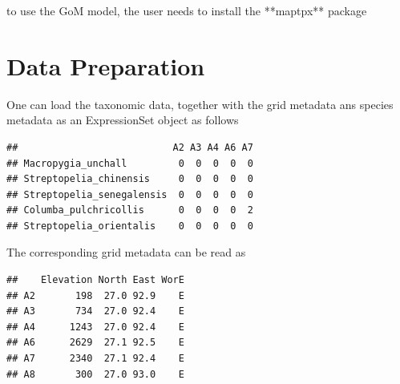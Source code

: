 \documentclass[12pt]{article}
\begin{document}
to use the GoM model, the user needs to install the **maptpx** package

\begin{knitrout}
\color{fgcolor}\begin{kframe}
\begin{alltt}
\hlstd{(}\hlstd{)}
\end{alltt}
\end{kframe}
\end{knitrout}


\section{Data Preparation}

One can load the taxonomic data, together with the grid metadata ans species metadata as an ExpressionSet object as follows

\begin{knitrout}
\color{fgcolor}\begin{kframe}
\begin{alltt}
 \hlkwb{<-} \hlstd{(}\hlstd{(}\hlstd{(}\hlstd{,} \hlstd{,}
                              \hlstd{=} \hlstd{)))}
 \hlkwb{<-} 
\hlstd{taxonomic_counts[}\hlopt{:}\hlstd{,}\hlopt{:}\hlstd{]}
\end{alltt}
\begin{verbatim}
##                           A2 A3 A4 A6 A7
## Macropygia_unchall         0  0  0  0  0
## Streptopelia_chinensis     0  0  0  0  0
## Streptopelia_senegalensis  0  0  0  0  0
## Columba_pulchricollis      0  0  0  0  2
## Streptopelia_orientalis    0  0  0  0  0
\end{verbatim}
\end{kframe}
\end{knitrout}


The corresponding grid metadata can be read as

\begin{knitrout}
\color{fgcolor}\begin{kframe}
\begin{alltt}
 \hlkwb{<-} \hlstd{(}
\end{alltt}
\begin{verbatim}
##    Elevation North East WorE
## A2       198  27.0 92.9    E
## A3       734  27.0 92.4    E
## A4      1243  27.0 92.4    E
## A6      2629  27.1 92.5    E
## A7      2340  27.1 92.4    E
## A8       300  27.0 93.0    E
\end{verbatim}
\end{kframe}
\end{knitrout}
\end{document}
